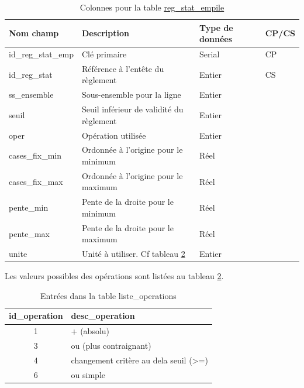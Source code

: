     \begin{table}[h]
       \centering
       \begin{tabular}{m{}|m{}m{}m{}}
            \hline
            Nom champ & Description & Type de données & CP/CS  \\
            \hline
            id\_reg\_stat\_emp & Clé primaire  & Serial & CP \\ 
            id\_reg\_stat & Référence à l'entête du règlement & Entier & CS \\ 
            ss\_ensemble & Sous-ensemble pour la ligne & Entier & \\ 
            seuil & Seuil inférieur de validité du règlement & Entier & \\ 
            oper  & Opération utilisée  & Entier & \\
            cases\_fix\_min & Ordonnée à l'origine pour le minimum & Réel & \\
            cases\_fix\_max & Ordonnée à l'origine pour le maximum  & Réel & \\ 
            pente\_min & Pente de la droite pour le minimum & Réel & \\
            pente\_max & Pente de la droite pour le maximum & Réel & \\
            unite & Unité à utiliser. Cf tableau \ref{tab:operations_table} & Entier & \\
            \hline
       \end{tabular}
       \caption{Colonnes pour la table \underline{reg\_stat\_empile}}
       \label{tab:definition_reg_stat_emp}
    \end{table}    
    \clearpage
    Les valeurs possibles des opérations sont listées au tableau \ref{tab:operations_table}.\par
    \begin{table}[h]
        \centering
        \begin{tabular}{cl}
             \hline
             id\_operation & desc\_operation  \\ \hline
             1 & + (absolu)\\
             3 & ou (plus contraignant) \\
             4 & changement critère au dela seuil (>=)\\
             6 & ou simple \\ \hline
        \end{tabular}
        \caption{Entrées dans la table liste\_operations}
        \label{tab:operations_table}
    \end{table}
